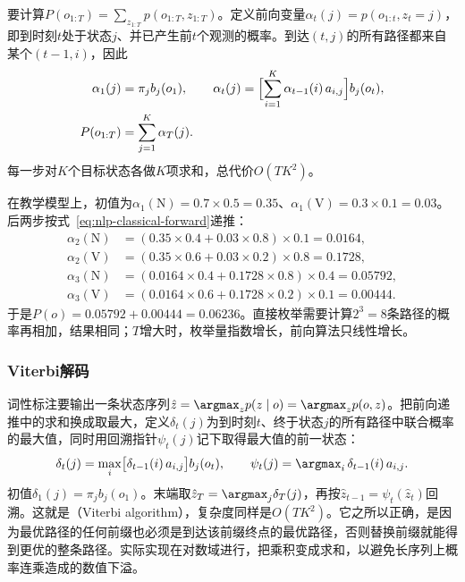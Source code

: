 要计算$P(o_{1:T})=\sum_{z_{1:T}}p(o_{1:T},z_{1:T})$。定义前向变量$\alpha_t(j)=p(o_{1:t},z_t=j)$，即到时刻$t$处于状态$j$、并已产生前$t$个观测的概率。到达$(t,j)$的所有路径都来自某个$(t-1,i)$，因此
\begin{equation}
  \begin{aligned}
    \alpha_1(j)&=\pi_jb_j(o_1),\qquad
    \alpha_t(j)=\Bigl[\sum_{i=1}^{K}\alpha_{t-1}(i)\,a_{i,j}\Bigr]b_j(o_t),\\
    P(o_{1:T})&=\sum_{j=1}^{K}\alpha_T(j).
  \end{aligned}
  \label{eq:nlp-classical-forward}
\end{equation}
每一步对$K$个目标状态各做$K$项求和，总代价$O(TK^2)$。

在教学模型上，初值为$\alpha_1(\mathrm N)=0.7\times0.5=0.35$、$\alpha_1(\mathrm V)=0.3\times0.1=0.03$。后两步按式~\eqref{eq:nlp-classical-forward}递推：
\[
\begin{aligned}
  \alpha_2(\mathrm N)&=(0.35\times0.4+0.03\times0.8)\times0.1=0.0164,\\
  \alpha_2(\mathrm V)&=(0.35\times0.6+0.03\times0.2)\times0.8=0.1728,\\
  \alpha_3(\mathrm N)&=(0.0164\times0.4+0.1728\times0.8)\times0.4=0.05792,\\
  \alpha_3(\mathrm V)&=(0.0164\times0.6+0.1728\times0.2)\times0.1=0.00444.
\end{aligned}
\]
于是$P(o)=0.05792+0.00444=0.06236$。直接枚举需要计算$2^3=8$条路径的概率再相加，结果相同；$T$增大时，枚举量指数增长，前向算法只线性增长。

\subsubsection{Viterbi解码}
\label{sec:nlp-classical-viterbi}

词性标注要输出一条状态序列$\hat z=\argmax_z p(z\mid o)=\argmax_z p(o,z)$。把前向递推中的求和换成取最大，定义$\delta_t(j)$为到时刻$t$、终于状态$j$的所有路径中联合概率的最大值，同时用回溯指针$\psi_t(j)$记下取得最大值的前一状态：
\begin{equation}
  \delta_t(j)=\max_{i}\bigl[\delta_{t-1}(i)\,a_{i,j}\bigr]b_j(o_t),\qquad
  \psi_t(j)=\argmax_{i}\,\delta_{t-1}(i)\,a_{i,j}.
  \label{eq:nlp-classical-viterbi}
\end{equation}
初值$\delta_1(j)=\pi_jb_j(o_1)$。末端取$\hat z_T=\argmax_j\delta_T(j)$，再按$\hat z_{t-1}=\psi_t(\hat z_t)$回溯。这就是（Viterbi algorithm），复杂度同样是$O(TK^2)$。它之所以正确，是因为最优路径的任何前缀也必须是到达该前缀终点的最优路径，否则替换前缀就能得到更优的整条路径。实际实现在对数域进行，把乘积变成求和，以避免长序列上概率连乘造成的数值下溢。

